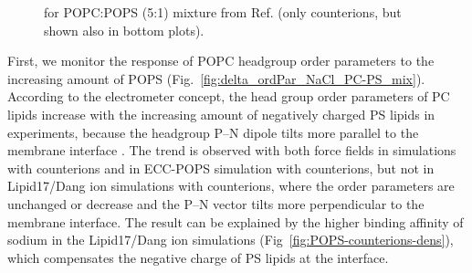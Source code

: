 \documentclass[journal=jpcbfk,manuscript=article]{achemso}
\begin{document}
\begin{figure}[!tbp]
{    for POPC:POPS (5:1) mixture from Ref.  (only  counterions, but shown also in bottom plots).
  }
   \\
\end{figure} 
First, we monitor the response of POPC headgroup order parameters to the increasing amount of POPS (Fig.~\ref{fig:delta_ordPar_NaCl_PC-PS_mix}).
According to the electrometer concept, the head group order parameters of PC lipids increase
with the increasing amount of negatively charged PS lipids in experiments, because the headgroup P--N dipole
tilts more parallel to the membrane interface \cite{seelig87,scherer87}.
The trend is observed with both force fields in simulations with  counterions and
in ECC-POPS simulation with  counterions, but not in Lipid17/Dang ion simulations with  counterions,
where the order parameters are unchanged or decrease and the P--N vector tilts more perpendicular to the membrane interface.
The result can be explained by the higher binding affinity of sodium in the
Lipid17/Dang ion simulations (Fig~\ref{fig:POPS-counterions-dens}), which
compensates the negative charge of PS lipids at the interface.
\end{document}
